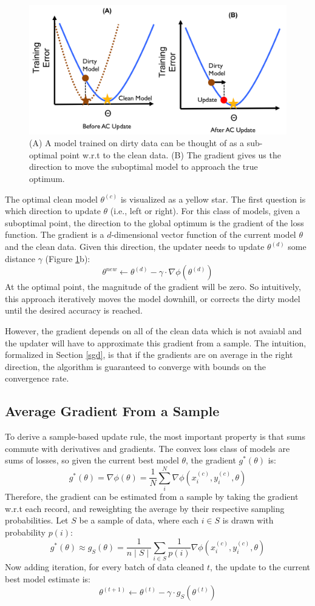 \begin{figure}[ht!]
\centering
 \includegraphics[width=0.7\columnwidth]{figs/update-arch2.png}
 \caption{(A) A model trained on dirty data can be thought of as a sub-optimal point w.r.t to the clean data. (B) The gradient gives us the direction to move the suboptimal model to approach the true optimum. \label{update-arch2}}
\end{figure}

The optimal clean model $\theta^{(c)}$ is visualized as a yellow star.
The first question is which direction to update $\theta$ (i.e., left or right).
For this class of models, given a suboptimal point, the direction to 
the global optimum is the gradient of the loss function.
The gradient is a $d$-dimensional vector function of the current model $\theta$ and the clean data.
Given this direction, the updater needs to update $\theta^{(d)}$ some distance $\gamma$ (Figure \ref{update-arch2}b):
\[
\theta^{new} \leftarrow \theta^{(d)} - \gamma \cdot \nabla\phi(\theta^{(d)})
\]
At the optimal point, the magnitude of the gradient will be zero.
So intuitively, this approach iteratively moves the model downhill, or corrects the dirty model until the desired accuracy is reached.

However, the gradient depends on all of the clean data which is not avaiabl and the updater will have to approximate this gradient from a sample.
The intuition, formalized in Section \ref{sgd}, is that if the gradients are on average in the right direction, the algorithm is guaranteed to converge with bounds on the convergence rate.

\subsection{Average Gradient From a Sample}
To derive a sample-based update rule, the most important property is that sums commute with derivatives and gradients.
The convex loss class of models are sums of losses, so given the current best model $\theta$, the gradient $g^*(\theta)$ is:
\[
g^*(\theta) = \nabla\phi(\theta) = \frac{1}{N} \sum_i^N \nabla\phi(x_i^{(c)},y_i^{(c)},\theta)
\]
Therefore, the gradient can be estimated from a sample by taking the gradient w.r.t each record, and reweighting the average by their respective sampling probabilities.
Let $S$ be a sample of data, where each $i \in S$ is drawn with probability $p(i)$:
\[
g^*(\theta) \approx g_{S}(\theta) = \frac{1}{n\mid S \mid} \sum_{i \in S}\frac{1}{p(i)}\nabla\phi(x_i^{(c)},y_i^{(c)},\theta)
\]
Now adding iteration, for every batch of data cleaned $t$, the update to the current best model estimate is:
\[
\theta^{(t+1)} \leftarrow \theta^{(t)} - \gamma \cdot g_{S}(\theta^{(t)})
\]


